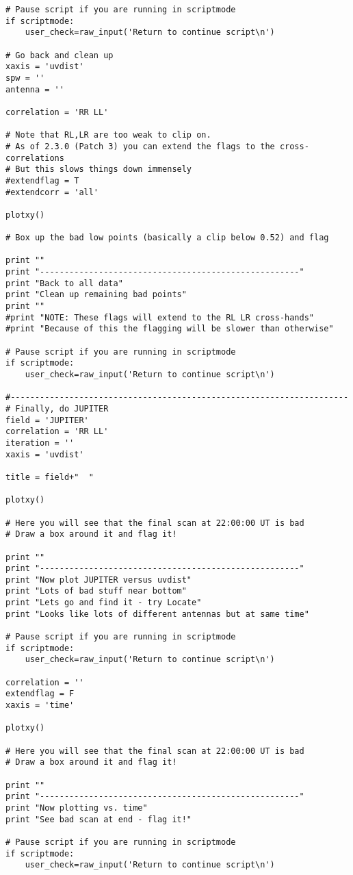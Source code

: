 \begin{verbatim}
# Pause script if you are running in scriptmode
if scriptmode:
    user_check=raw_input('Return to continue script\n')

# Go back and clean up
xaxis = 'uvdist'
spw = ''
antenna = ''

correlation = 'RR LL'

# Note that RL,LR are too weak to clip on.
# As of 2.3.0 (Patch 3) you can extend the flags to the cross-correlations
# But this slows things down immensely
#extendflag = T
#extendcorr = 'all'

plotxy()

# Box up the bad low points (basically a clip below 0.52) and flag

print ""
print "-----------------------------------------------------"
print "Back to all data"
print "Clean up remaining bad points"
print ""
#print "NOTE: These flags will extend to the RL LR cross-hands"
#print "Because of this the flagging will be slower than otherwise"

# Pause script if you are running in scriptmode
if scriptmode:
    user_check=raw_input('Return to continue script\n')

#---------------------------------------------------------------------
# Finally, do JUPITER
field = 'JUPITER'
correlation = 'RR LL'
iteration = ''
xaxis = 'uvdist'

title = field+"  "

plotxy()

# Here you will see that the final scan at 22:00:00 UT is bad
# Draw a box around it and flag it!

print ""
print "-----------------------------------------------------"
print "Now plot JUPITER versus uvdist"
print "Lots of bad stuff near bottom"
print "Lets go and find it - try Locate"
print "Looks like lots of different antennas but at same time"

# Pause script if you are running in scriptmode
if scriptmode:
    user_check=raw_input('Return to continue script\n')

correlation = ''
extendflag = F
xaxis = 'time'

plotxy()

# Here you will see that the final scan at 22:00:00 UT is bad
# Draw a box around it and flag it!

print ""
print "-----------------------------------------------------"
print "Now plotting vs. time"
print "See bad scan at end - flag it!"

# Pause script if you are running in scriptmode
if scriptmode:
    user_check=raw_input('Return to continue script\n')


\end{verbatim}
